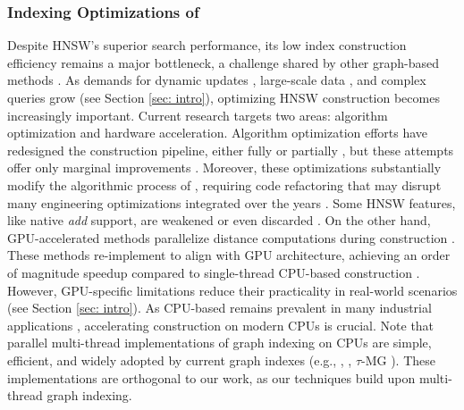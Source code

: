 \subsubsection{\textbf{Indexing Optimizations of }}
\label{subsubsec: Index Opt HNSW}
Despite HNSW's superior search performance, its low index construction efficiency remains a major bottleneck, a challenge shared by other graph-based methods \cite{HVS,NSG,NSSG,DiskANN,zhao2023towards,aumuller2023recent}. As demands for dynamic updates \cite{XuLLXCZLYYYCY23,Fresh-DiskANN}, large-scale data \cite{DiskANN,SPANN}, and complex queries \cite{PatelKGZ24,ZuoQZLD24} grow (see Section \ref{sec: intro}), optimizing HNSW construction becomes increasingly important. Current research targets two areas: algorithm optimization and hardware acceleration.
Algorithm optimization efforts have redesigned the construction pipeline, either fully \cite{NSG,tau-MG} or partially \cite{HVS}, but these attempts offer only marginal improvements \cite{NSG,NSSG,zhao2023towards}. Moreover, these optimizations substantially modify the algorithmic process of , requiring code refactoring that may disrupt many engineering optimizations integrated over the years \cite{hnswlib,n2,Faiss}. Some HNSW features, like native \textit{add} support, are weakened \cite{HVS} or even discarded \cite{NSG}.
On the other hand, GPU-accelerated methods parallelize distance computations during  construction \cite{WangZZY21,CAGRA,GGNN}. These methods re-implement  to align with GPU architecture, achieving an order of magnitude speedup compared to single-thread CPU-based construction \cite{GANNS}. However, GPU-specific limitations reduce their practicality in real-world scenarios \cite{ZhangL0L024} (see Section \ref{sec: intro}). As CPU-based  remains prevalent in many industrial applications \cite{Milvus_sigmod2021,ColemanSSS22,douze2024faiss,PASE}, accelerating  construction on modern CPUs is crucial. {Note that parallel multi-thread implementations of graph indexing on CPUs are simple, efficient, and widely adopted by current graph indexes (e.g., ,  \cite{NSG}, $\tau$-MG \cite{tau-MG}). These implementations are orthogonal to our work, as our techniques build upon multi-thread graph indexing.}

